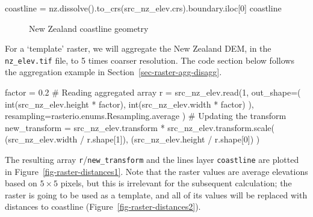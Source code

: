 \documentclass[
  letterpaper,
]{krantz}
\newenvironment{Shaded}{\begin{snugshade}}{\end{snugshade}}
\newcommand{\BuiltInTok}[1]{\textcolor[rgb]{0.00,0.23,0.31}{#1}}
\newcommand{\CommentTok}[1]{\textcolor[rgb]{0.37,0.37,0.37}{#1}}
\newcommand{\DecValTok}[1]{\textcolor[rgb]{0.68,0.00,0.00}{#1}}
\newcommand{\FloatTok}[1]{\textcolor[rgb]{0.68,0.00,0.00}{#1}}
\newcommand{\NormalTok}[1]{\textcolor[rgb]{0.00,0.23,0.31}{#1}}
\newcommand{\OperatorTok}[1]{\textcolor[rgb]{0.37,0.37,0.37}{#1}}
\begin{document}
\begin{Shaded}
\begin{Highlighting}[]
\NormalTok{coastline }\OperatorTok{=}\NormalTok{ nz.dissolve().to\_crs(src\_nz\_elev.crs).boundary.iloc[}\DecValTok{0}\NormalTok{]}
\NormalTok{coastline}
\end{Highlighting}
\end{Shaded}

\begin{figure}[H]


\caption{\label{fig-nz-coastline}New Zealand coastline geometry}

\end{figure}%

For a `template' raster, we will aggregate the New Zealand DEM, in the
\texttt{nz\_elev.tif} file, to 5 times coarser resolution. The code
section below follows the aggregation example in
Section~\ref{sec-raster-agg-disagg}.

\begin{Shaded}
\begin{Highlighting}[]
\NormalTok{factor }\OperatorTok{=} \FloatTok{0.2}
\CommentTok{\# Reading aggregated array}
\NormalTok{r }\OperatorTok{=}\NormalTok{ src\_nz\_elev.read(}\DecValTok{1}\NormalTok{,}
\NormalTok{    out\_shape}\OperatorTok{=}\NormalTok{(}
        \BuiltInTok{int}\NormalTok{(src\_nz\_elev.height }\OperatorTok{*}\NormalTok{ factor),}
        \BuiltInTok{int}\NormalTok{(src\_nz\_elev.width }\OperatorTok{*}\NormalTok{ factor)}
\NormalTok{        ),}
\NormalTok{    resampling}\OperatorTok{=}\NormalTok{rasterio.enums.Resampling.average}
\NormalTok{)}
\CommentTok{\# Updating the transform}
\NormalTok{new\_transform }\OperatorTok{=}\NormalTok{ src\_nz\_elev.transform }\OperatorTok{*}\NormalTok{ src\_nz\_elev.transform.scale(}
\NormalTok{    (src\_nz\_elev.width }\OperatorTok{/}\NormalTok{ r.shape[}\DecValTok{1}\NormalTok{]),}
\NormalTok{    (src\_nz\_elev.height }\OperatorTok{/}\NormalTok{ r.shape[}\DecValTok{0}\NormalTok{])}
\NormalTok{)}
\end{Highlighting}
\end{Shaded}

The resulting array \texttt{r}/\texttt{new\_transform} and the lines
layer \texttt{coastline} are plotted in
Figure~\ref{fig-raster-distances1}. Note that the raster values are
average elevations based on \(5 \times 5\) pixels, but this is
irrelevant for the subsequent calculation; the raster is going to be
used as a template, and all of its values will be replaced with
distances to coastline (Figure~\ref{fig-raster-distances2}).
\end{document}
